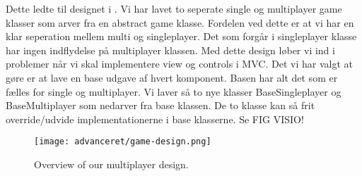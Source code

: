 Dette ledte til designet i  . Vi har lavet to seperate single og multiplayer game klasser som arver fra en abstract game klasse. Fordelen ved dette er at vi har en klar seperation mellem multi og singleplayer. Det som forgår i singleplayer klasse har ingen indflydelse på multiplayer klassen. Med dette design løber vi ind i problemer når vi skal implementere view og controls i MVC. Det vi har valgt at gøre er at lave en base udgave af hvert komponent. Basen har alt det som er fælles for single og multiplayer. Vi laver så to nye klasser BaseSingleplayer og BaseMultiplayer som nedarver fra base klassen.  De to klasse kan så frit override/udvide implementationerne i base klasserne.  Se FIG VISIO!


\begin{figure}[h]
	\centering
	\graphicspath{ {pics/} }
   \texttt{[image: advanceret/game-design.png]}
	\hspace{0.1\textwidth}
	\caption{Overview of our multiplayer design.}
\end{figure}

